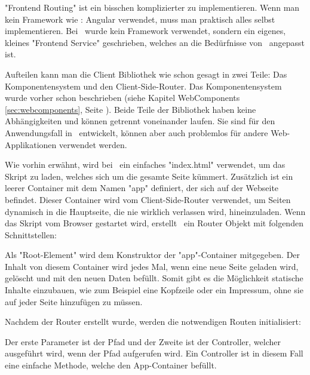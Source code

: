 \label{sec:csrouterimp}

"Frontend Routing" ist ein bisschen komplizierter zu implementieren. Wenn man kein Framework wie \zb: Angular verwendet, muss man praktisch alles selbst implementieren. Bei \ZELIA\ wurde kein Framework verwendet, sondern  ein eigenes, kleines "Frontend Service" geschrieben, welches an die Bedürfnisse von \ZELIA\ angepasst ist.

Aufteilen kann man die Client Bibliothek wie schon gesagt in zwei Teile: Das Komponentensystem und den Client-Side-Router. Das Komponentensystem wurde vorher schon beschrieben (siehe Kapitel WebComponents \ref{sec:webcomponents}, Seite \pageref{sec:webcomponents}). Beide Teile der Bibliothek haben keine Abhängigkeiten und können getrennt voneinander laufen. Sie sind für den Anwendungsfall in \ZELIA\ entwickelt, können aber auch problemlos für andere Web-Applikationen verwendet werden.

Wie vorhin erwähnt, wird bei \ZELIA\ ein einfaches "index.html" verwendet, um das Skript zu laden, welches sich um die gesamte Seite kümmert. Zusätzlich ist ein leerer Container mit dem Namen "app" definiert, der sich auf der Webseite befindet. Dieser Container wird vom Client-Side-Router verwendet, um Seiten dynamisch in die Hauptseite, die nie wirklich verlassen wird, hineinzuladen. Wenn das Skript vom Browser gestartet wird, erstellt \ZELIA\ ein Router Objekt mit folgenden Schnittstellen:


Als "Root-Element" wird dem Konstruktor der "app"-Container mitgegeben. Der Inhalt von diesem Container wird jedes Mal, wenn eine neue Seite geladen wird, gelöscht und mit den neuen Daten befüllt. Somit gibt es die Möglichkeit statische Inhalte einzubauen, wie zum Beispiel eine Kopfzeile oder ein Impressum, ohne sie auf jeder Seite hinzufügen zu müssen.

Nachdem der Router erstellt wurde, werden die notwendigen Routen initialisiert:



Der erste Parameter ist der Pfad und der Zweite ist der Controller, welcher ausgeführt wird, wenn der Pfad aufgerufen wird. Ein Controller ist in diesem Fall eine einfache Methode, welche den App-Container befüllt.



